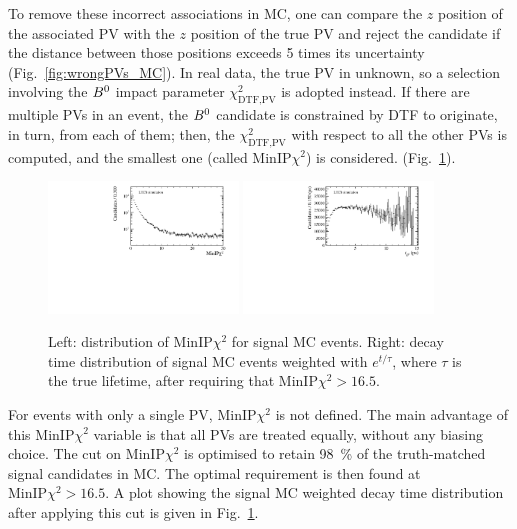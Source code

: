 %
To remove these incorrect associations in MC, one can compare the
$z$ position of the associated PV with the $z$ position of the true PV and
reject the candidate if the distance between those positions exceeds 5 times its
uncertainty (Fig.~\ref{fig:wrongPVs_MC}). 
In real data, the true PV in unknown, so a selection involving
the $B^0$ impact parameter $\chi^2_\text{DTF,PV}$ is adopted instead.
If there are multiple PVs in an event, the $B^0$ candidate is constrained by DTF to originate,
in turn, from each of them; then, the $\chi^2_\text{DTF,PV}$ with respect to all the other
PVs is computed, and the smallest one (called $\mathrm{MinIP}\chi^2$) is considered.
(Fig.~\ref{fig:MinIPCHI2}).
%
\begin{figure}[t]
	\begin{center}
		\includegraphics[width=0.45\textwidth]{02Selection/figs/MinIPCHI2.pdf}
		\includegraphics[width=0.45\textwidth]{02Selection/figs/WrongPVs-WeightingGoodData.pdf}
	\end{center}
        \vspace{-2mm}
	\caption{Left: distribution of $\mathrm{MinIP}\chi^2$
	for signal MC events. Right: decay time distribution 
	of signal MC events weighted with $e^{t/\tau}$, where $\tau$ is the true lifetime, 
	after requiring that $\mathrm{MinIP}\chi^2>16.5$.}
	\label{fig:MinIPCHI2}
\end{figure}
For events with only a single PV, $\mathrm{MinIP}\chi^2$ is not defined. The main advantage of this
$\mathrm{MinIP}\chi^2$ variable is that all PVs are treated equally, without any biasing choice. 
The cut on $\mathrm{MinIP}\chi^2$ is optimised to retain \SI{98}{\%} of the truth-matched signal candidates in MC.
The optimal requirement is then found at
$\mathrm{MinIP}\chi^2>\num{16.5}$. A plot showing the signal MC weighted decay time
distribution after applying this cut is given in Fig.~\ref{fig:MinIPCHI2}.

